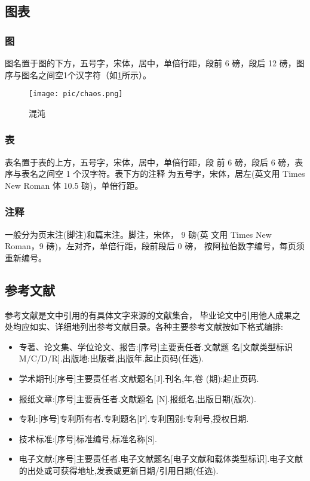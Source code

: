\documentclass[oneside]{LZU}
\begin{document}
\subsection{图表}
\subsubsection{图}
\label{ssub:figure}
图名置于图的下方，五号字，宋体，居中，单倍行距，段前 6 磅，段后 12 磅，图序与图名之间空1个汉字符（如\cref{fig:chaos}所示）。
\begin{figure}
    \centering
    \texttt{[image: pic/chaos.png]}
    \caption{混沌}
    \label{fig:chaos}
\end{figure}

\subsubsection{表}
表名置于表的上方，五号字，宋体，居中，单倍行距，段 前 6 磅，段后 6 磅，表序与表名之间空 1 个汉字符。表下方的注释 为五号字，宋体，居左(英文用 Times New Roman 体 10.5 磅)，单倍行距。
\subsubsection{注释}
一般分为页末注(脚注)和篇末注。脚注，宋体， 9 磅(英 文用 Times New Roman，9 磅)，左对齐，单倍行距，段前段后 0 磅， 按阿拉伯数字编号，每页须重新编号。
\subsection{参考文献}
\label{subsec:reference}
参考文献是文中引用的有具体文字来源的文献集合， 毕业论文中引用他人成果之处均应如实、详细地列出参考文献目录。各种主要参考文献按如下格式编排:
\begin{itemize}
    \item 专著、论文集、学位论文、报告:[序号]主要责任者.文献题 名[文献类型标识M/C/D/R].出版地:出版者,出版年.起止页码(任选).
    \item 学术期刊:[序号]主要责任者.文献题名[J].刊名,年,卷 (期):起止页码.
    \item 报纸文章:[序号]主要责任者.文献题名 [N].报纸名,出版日期(版次).
    \item 专利:[序号]专利所有者.专利题名[P].专利国别:专利号,授权日期.
    \item 技术标准:[序号]标准编号,标准名称[S].
    \item 电子文献:[序号]主要责任者.电子文献题名[电子文献和载体类型标识].电子文献的出处或可获得地址,发表或更新日期/引用日期(任选).
\end{itemize}
\end{document}
